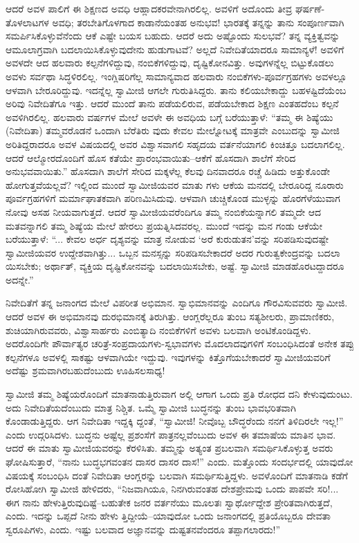 ಆದರೆ ಅವಳ ಪಾಲಿಗೆ ಈ ಶಿಕ್ಷಣದ ಅವಧಿ ಆಹ್ಲಾದಕರವೇನಾಗಿರಲಿಲ್ಲ. ಅವಳಿಗೆ ಅದೊಂದು ತೀವ್ರ ಘರ್ಷಣೆ-ತೊಳಲಾಟಗಳ ಅವಧಿ; ತರಬೇತಿಗೊಳಗಾದ ಕಾಡಾನೆಯಂತಹ ಅನುಭವ! ಭಾರತಕ್ಕೆ ತನ್ನನ್ನು ತಾನು ಸಂಪೂರ್ಣವಾಗಿ ಸಮರ್ಪಿಸಿಕೊಳ್ಳುವೆನೆಂದು ಆಕೆ ಎಷ್ಟೇ ಬಯಸ ಬಹುದು. ಆದರೆ ಅದು ಅಷ್ಟೊಂದು ಸುಲಭವೆ? ತನ್ನ ವ್ಯಕ್ತಿತ್ವವನ್ನು ಆಮೂಲಾಗ್ರವಾಗಿ ಬದಲಾಯಿಸಿಕೊಳ್ಳುವುದೇನು ಹುಡುಗಾಟವೆ? ಅಲ್ಲದೆ ನಿವೇದಿತೆಯಾದರೂ ಸಾಮಾನ್ಯಳೆ! ಅವಳಿಗೆ ಅವಳದೇ ಆದ ಹಲವಾರು ಕಲ್ಪನೆಗಳಿದ್ದುವು, ನಂಬಿಕೆಗಳಿದ್ದುವು, ದೃಷ್ಟಿಕೋನವಿತ್ತು. ಅವುಗಳನ್ನೆಲ್ಲ ಬಿಟ್ಟುಕೊಡಲು ಅವಳು ಸರ್ವಥಾ ಸಿದ್ಧಳಿರಲಿಲ್ಲ. ಇಂಗ್ಲಿಷರಿಗೆಲ್ಲ ಸಾಮಾನ್ಯವಾದ ಹಲವಾರು ನಂಬಿಕೆಗಳು-ಪೂರ್ವಗ್ರಹಗಳು ಅವಳಲ್ಲೂ ಆಳವಾಗಿ ಬೇರೂರಿದ್ದುವು. ಇದನ್ನೆಲ್ಲ ಸ್ವಾಮೀಜಿ ಆಗಲೇ ಗುರುತಿಸಿದ್ದರು. ತಾನು ಕಲಿಯಬೇಕಾದ್ದು ಬಹಳಷ್ಟಿದೆಯೆಂಬ ಅರಿವು ನಿವೇದಿತೆಗೂ ಇತ್ತು. ಆದರೆ ಮುಂದೆ ತಾನು ಪಡೆಯಲಿರುವ, ಪಡೆಯಬೇಕಾದ ಶಿಕ್ಷಣ ಎಂತಹದೆಂಬ ಕಲ್ಪನೆ ಅವಳಿಗಿರಲಿಲ್ಲ. ಹಲವಾರು ವರ್ಷಗಳ ಮೇಲೆ ಅವಳೇ ಈ ಅವಧಿಯ ಬಗ್ಗೆ ಬರೆಯುತ್ತಾಳೆ: “ತಮ್ಮ ಈ ಶಿಷ್ಯೆಯು (ನಿವೇದಿತಾ) ತಮ್ಮವರೊಡನೆ ಒಂದಾಗಿ ಬೆರೆತಿರು ವುದು ಕೇವಲ ಮೇಲ್ನೋಟಕ್ಕೆ ಮಾತ್ರವೇ ಎಂಬುದನ್ನು ಸ್ವಾಮೀಜಿ ಅರಿತಿದ್ದರಾದರೂ ಅವಳ ವಿಷಯದಲ್ಲಿ ಅವರ ವಿಶ್ವಾಸವಾಗಲಿ ಸಹೃದಯ ವರ್ತನೆಯಾಗಲಿ ಕಿಂಚಿತ್ತೂ ಬದಲಾಗಲಿಲ್ಲ. ಆದರೆ ಆಲ್ಮೋರದೊಂದಿಗೆ ಹೊಸ ಕತೆಯೇ ಪ್ರಾರಂಭವಾಯಿತು–ಆಕೆಗೆ ಹೊಸದಾಗಿ ಶಾಲೆಗೆ ಸೇರಿದ ಅನುಭವವಾಯಿತು.” ಹೊಸದಾಗಿ ಶಾಲೆಗೆ ಸೇರಿದ ಮಕ್ಕಳೆಲ್ಲ ಕೆಲವು ದಿನವಾದರೂ ರಚ್ಚೆ ಹಿಡಿದು ಅತ್ತುಕೊಂಡೇ ಹೋಗುತ್ತವೆಯಲ್ಲವೆ? ಇಲ್ಲಿಂದ ಮುಂದೆ ಸ್ವಾಮೀಜಿಯವರ ಮಾತು ಗಳು ಆಕೆಯ ಮನದಲ್ಲಿ ಬೇರೂರಿದ್ದ ನೂರಾರು ಪೂರ್ವಗ್ರಹಗಳಿಗೆ ಮರ್ಮಾಘಾತಕವಾಗಿ ಪರಿಣಮಿಸಿದುವು. ಆಳವಾಗಿ ಚುಚ್ಚಿಕೊಂಡ ಮುಳ್ಳನ್ನು ಹೊರಗೆಳೆಯುವಾಗ ನೋವು ಅಸಹ ನೀಯವಾಗುತ್ತದೆ. ಆದರೆ ಸ್ವಾಮೀಜಿಯವರೆಂದಿಗೂ ತಮ್ಮ ನಂಬಿಕೆಯನ್ನಾಗಲಿ ತಮ್ಮದೇ ಆದ ಮತವನ್ನಾಗಲಿ ತಮ್ಮ ಶಿಷ್ಯೆಯ ಮೇಲೆ ಹೇರಲು ಪ್ರಯತ್ನಿಸಿದವರಲ್ಲ. ಮುಂದೆ ಇದನ್ನು ಮನ ಗಂಡು ಆಕೆಯೇ ಬರೆಯುತ್ತಾಳೆ: “... ಕೇವಲ ಅರ್ಧ ದೃಶ್ಯವನ್ನು ಮಾತ್ರ ನೋಡುವ ‘ಅರೆ ಕುರುಡುತನ’ವನ್ನು ಸರಿಪಡಿಸುವುದಷ್ಟೇ ಸ್ವಾಮೀಜಿಯವರ ಉದ್ದೇಶವಾಗಿತ್ತು... ಒಬ್ಬನ ಮನಸ್ಸನ್ನು ಸರಿಪಡಿಸಬೇಕಾದರೆ ಅದರ ಗುರುತ್ವಕೇಂದ್ರವನ್ನು ಬದಲಾ ಯಿಸಬೇಕು; ಅರ್ಥಾತ್, ವ್ಯಕ್ತಿಯ ದೃಷ್ಟಿಕೋನವನ್ನು ಬದಲಾಯಿಸಬೇಕು, ಅಷ್ಟೆ. ಸ್ವಾಮೀಜಿ ಮಾಡಹೊರಟದ್ದಾದರೂ ಅದನ್ನೇ.”

ನಿವೇದಿತೆಗೆ ತನ್ನ ಜನಾಂಗದ ಮೇಲೆ ವಿಪರೀತ ಅಭಿಮಾನ. ಸ್ವಾಭಿಮಾನವನ್ನು ಎಂದಿಗೂ ಗೌರವಿಸುವವರು ಸ್ವಾಮೀಜಿ. ಆದರೆ ಅವಳ ಈ ಅಭಿಮಾನವು ದುರಭಿಮಾನಕ್ಕೆ ತಿರುಗಿತ್ತು. ಆಂಗ್ಲರೆಲ್ಲರೂ ತುಂಬ ಸತ್ಯಶೀಲರು, ಪ್ರಾಮಾಣಿಕರು, ಶುಚಿಯಾಗಿರುವವರು, ವಿಶ್ವಾಸಾರ್ಹರು ಎಂಬಿತ್ಯಾದಿ ನಂಬಿಕೆಗಳಿಗೆ ಅವಳು ಬಲವಾಗಿ ಅಂಟಿಕೊಂಡಿದ್ದಳು. ಅದರೊಂದಿಗೇ ಪೌರ್ವಾತ್ಯರ ಚರಿತ್ರೆ-ಸಂಪ್ರದಾಯಗಳು-ಸ್ವಭಾವಗಳು ಮೊದಲಾದವುಗಳಿಗೆ ಸಂಬಂಧಿಸಿದಂತೆ ಅನೇಕ ತಪ್ಪು ಕಲ್ಪನೆಗಳೂ ಅವಳಲ್ಲಿ ಸಾಕಷ್ಟು ಆಳವಾಗಿಯೇ ಇದ್ದುವು. ಇವುಗಳನ್ನು ಕಿತ್ತೊಗೆಯಬೇಕಾದರೆ ಸ್ವಾಮೀಜಿಯವರಿಗೆ ಅದೆಷ್ಟು ಶ್ರಮವಾಗಿರಬಹುದೆಂಬುದು ಊಹಿಸಲಸಾಧ್ಯ!

ಸ್ವಾಮೀಜಿ ತಮ್ಮ ಶಿಷ್ಯೆಯರೊಂದಿಗೆ ಮಾತನಾಡುತ್ತಿರುವಾಗ ಅಲ್ಲಿ ಆಗಾಗ ಒಂದು ಪ್ರತಿ ರೋಧದ ದನಿ ಕೇಳುವುದುಂಟು. ಅದು ನಿವೇದಿತೆಯದೆಂಬುದು ಮಾತ್ರ ನಿಶ್ಚಿತ. ಒಮ್ಮೆ ಸ್ವಾಮೀಜಿ ಬುದ್ಧನನ್ನು ತುಂಬ ಭಾವಭರಿತವಾಗಿ ಕೊಂಡಾಡುತ್ತಿದ್ದರು. ಆಗ ನಿವೇದಿತಾ ಇದ್ದಕ್ಕಿ ದ್ದಂತೆ, “ಸ್ವಾಮೀಜಿ! ನೀವೊಬ್ಬ ಬೌದ್ಧರೆಂದು ನನಗೆ ತಿಳಿದಿರಲೇ ಇಲ್ಲ!” ಎಂದು ಉದ್ಗರಿಸಿದಳು. ಬುದ್ಧನು ಅಷ್ಟೆಲ್ಲ ಪ್ರಶಂಸೆಗೆ ಪಾತ್ರನಲ್ಲವೆಂಬುದು ಅವಳ ಈ ತಮಾಷೆಯ ಮಾತಿನ ಭಾವ. ಆದರೆ ಈ ಮಾತು ಸ್ವಾಮೀಜಿಯವರನ್ನು ಕೆರಳಿಸಿತು. ತಮ್ಮನ್ನು ಅತ್ಯಂತ ಪ್ರಬಲವಾಗಿ ಸಮರ್ಥಿಸಿಕೊಳ್ಳುತ್ತ ಅವರು ಘೋಷಿಸುತ್ತಾರೆ, “ನಾನು ಬುದ್ಧಭಗವಂತನ ದಾಸರ ದಾಸರ ದಾಸ!” ಎಂದು. ಮತ್ತೊಂದು ಸಂದರ್ಭದಲ್ಲಿ ಯಾವುದೋ ವಿಷಯಕ್ಕೆ ಸಂಬಂಧಿಸಿ ದಂತೆ ನಿವೇದಿತಾ ಆಂಗ್ಲರನ್ನು ಬಲವಾಗಿ ಸಮರ್ಥಿಸುತ್ತಿದ್ದಳು. ಅವಳೊಂದಿಗೆ ಮಾತನಾಡಿ ಕಡೆಗೆ ರೋಸಿಹೋಗಿ ಸ್ವಾಮೀಜಿ ಹೇಳಿದರು, “ನಿಜವಾಗಿಯೂ, ನಿನಗಿರುವಂತಹ ದೇಶಪ್ರೇಮವು ಒಂದು ಪಾಪವೇ ಸರಿ!... ಈಗ ನಾನು ಹೇಳುತ್ತಿರುವುದಿಷ್ಟೆ–ಬಹುತೇಕ ಜನರ ವರ್ತನೆಯು ಮೂಲತಃ ಸ್ವಾರ್ಥೋದ್ದೇಶ ಪ್ರೇರಿತವಾಗಿರುತ್ತದೆ, ಎಂದು. ಇದನ್ನು ಒಪ್ಪದೆ ನೀನು ಹೇಳು ತ್ತಿದ್ದೀಯೆ–ಯಾವುದೋ ಒಂದು ಜನಾಂಗದಲ್ಲಿ ಪ್ರತಿಯೊಬ್ಬರೂ ದೇವತಾ ಸ್ವರೂಪಿಗಳು, ಎಂದು. ಇಷ್ಟು ಬಲವಾದ ಅಜ್ಞಾನವನ್ನು ದುಷ್ಟತನವೆಂದರೂ ತಪ್ಪಾಗಲಾರದು!”

